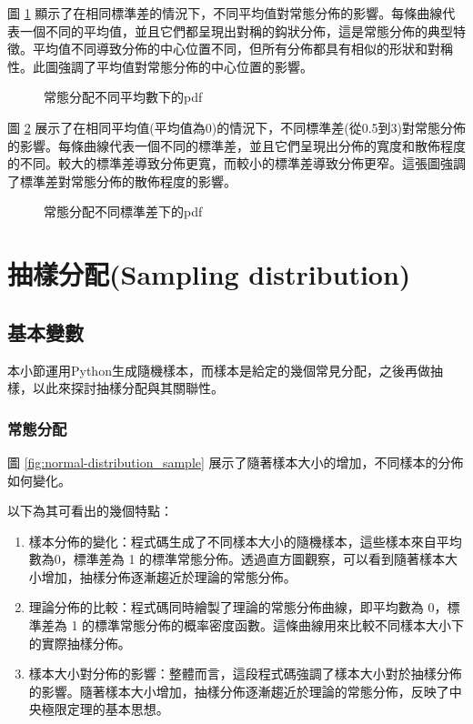 \documentclass[12pt, a4paper]{article}
\begin{document}
圖 \ref{fig:normal-distribution_mean} 顯示了在相同標準差的情況下，不同平均值對常態分佈的影響。每條曲線代表一個不同的平均值，並且它們都呈現出對稱的鈎狀分佈，這是常態分佈的典型特徵。平均值不同導致分佈的中心位置不同，但所有分佈都具有相似的形狀和對稱性。此圖強調了平均值對常態分佈的中心位置的影響。
\begin{figure}[H]
    \caption{常態分配不同平均數下的pdf}
    \label{fig:normal-distribution_mean}
\end{figure}
圖 \ref{fig:normal-distribution_std} 展示了在相同平均值(平均值為0)的情況下，不同標準差(從0.5到3)對常態分佈的影響。每條曲線代表一個不同的標準差，並且它們呈現出分佈的寬度和散佈程度的不同。較大的標準差導致分佈更寬，而較小的標準差導致分佈更窄。這張圖強調了標準差對常態分佈的散佈程度的影響。
\begin{figure}[H]
    \caption{常態分配不同標準差下的pdf}
    \label{fig:normal-distribution_std}
\end{figure}
\section{抽樣分配(Sampling distribution)}
\subsection{基本變數}
本小節運用Python生成隨機樣本，而樣本是給定的幾個常見分配，之後再做抽樣，以此來探討抽樣分配與其關聯性。
\subsubsection{常態分配}
圖 \ref{fig:normal-distribution_sample} 展示了隨著樣本大小的增加，不同樣本的分佈如何變化。

以下為其可看出的幾個特點：

\begin{enumerate}
\item 樣本分佈的變化：程式碼生成了不同樣本大小的隨機樣本，這些樣本來自平均數為0，標準差為 1 的標準常態分佈。透過直方圖觀察，可以看到隨著樣本大小增加，抽樣分佈逐漸趨近於理論的常態分佈。
\item 理論分佈的比較：程式碼同時繪製了理論的常態分佈曲線，即平均數為 0，標準差為 1 的標準常態分佈的概率密度函數。這條曲線用來比較不同樣本大小下的實際抽樣分佈。
\item 樣本大小對分佈的影響：整體而言，這段程式碼強調了樣本大小對於抽樣分佈的影響。隨著樣本大小增加，抽樣分佈逐漸趨近於理論的常態分佈，反映了中央極限定理的基本思想。
\end{enumerate}
\end{document}
